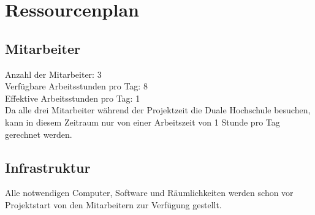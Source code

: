 \section{Ressourcenplan}
\subsection{Mitarbeiter}
Anzahl der Mitarbeiter: 3 \\

\noindent Verfügbare Arbeitsstunden pro Tag: 8 \\

\noindent Effektive Arbeitsstunden pro Tag: 1 \\

\noindent Da alle drei Mitarbeiter während der Projektzeit die Duale Hochschule besuchen, kann in diesem Zeitraum nur von einer Arbeitszeit von 1 Stunde pro Tag gerechnet werden.

\subsection{Infrastruktur}
Alle notwendigen Computer, Software und Räumlichkeiten werden schon vor Projektstart von den Mitarbeitern zur Verfügung gestellt.